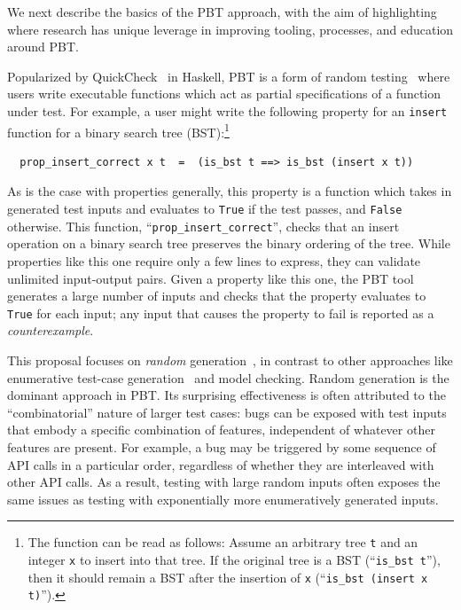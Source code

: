 %
We next describe the basics of the PBT approach, with the aim of highlighting
where research has unique leverage in improving tooling, processes, and
education around PBT.

Popularized by QuickCheck~\cite{hughes2007quickcheck} in Haskell,
PBT is a form of random testing~\cite{hamlet1994random} where
users write executable functions which act as partial
specifications of a function under test. For example, a user might
write the following property for an \lstinline{insert}
function for a binary search tree (BST):\footnote{The function can be read as
follows:
Assume an arbitrary tree \texttt{t} and an integer
\texttt{x} to insert into that tree. If the original tree
is a BST (``\lstinline{is_bst t}''), then it should remain
a BST after the insertion of \texttt{x} (``\lstinline{is_bst (insert x t)}'').}
\begin{lstlisting}
  prop_insert_correct x t  =  (is_bst t ==> is_bst (insert x t))
\end{lstlisting}
As is the case with properties generally, this property is a function which
takes in generated
test inputs and evaluates to \lstinline{True} if the test passes, and
\lstinline{False} otherwise.  This function, ``\verb|prop_insert_correct|'',
checks
that an insert operation on a binary search tree preserves the
binary ordering of the tree.
While properties like this one require
only a few lines to express, they can validate unlimited
input-output pairs.  Given a property like this one, the PBT tool generates a
large number of inputs and
checks that the property evaluates to \lstinline{True} for each input; any input
that causes the property to fail is reported as a {\em counterexample}.

This proposal focuses on {\em random}
generation~\cite{hamlet1994random}, in contrast to other
approaches like enumerative test-case
generation~\cite{DBLP:conf/haskell/RuncimanNL08, leancheck} and model
checking. Random generation is the dominant approach in PBT. Its
surprising effectiveness is often attributed to the
``combinatorial'' nature of larger test cases: bugs can be
exposed with test inputs that embody a specific combination of features,
independent of whatever other features are present. For example,
a bug may be triggered by some sequence of API calls in a
particular order,
regardless of whether they are
interleaved with other API calls. As a result, testing with large random
inputs often exposes the same issues as testing with exponentially more
enumeratively generated inputs.

